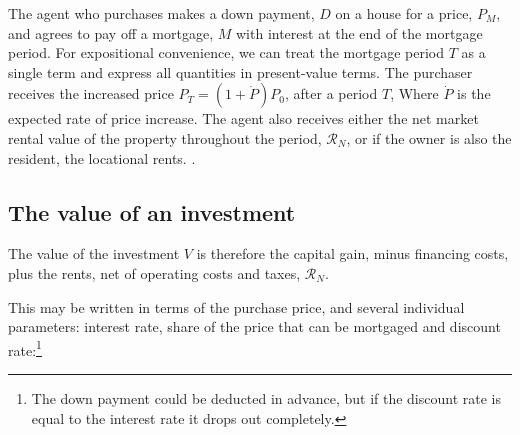 

    
 The agent who purchases makes a down payment, $D$ on a house for a price, $P_M$, and agrees to pay off a mortgage, $M$ with interest at the end of the mortgage period. For expositional convenience, we can treat the mortgage period $T$ as a single term and express all quantities  in present-value terms. The purchaser  receives the increased price $P_T = (1 + \dot P)P_0$,  after a period $T$, Where $\dot P$ is the expected rate of price increase. The agent also receives either the net market rental value of the property throughout the period, $\mathcal{R}_N$, or if the owner is also the resident, the locational rents.
\cite{anselinModernSpatialEconometrics2014, gelmanDataAnalysisUsing2006}.





 \subsection{The value of an investment}
The value of the investment $V$ is therefore the capital gain, minus financing costs, plus the rents, net of operating costs and taxes, $\mathcal{R}_N$.
 
 This may be written in terms of the purchase price, and several individual parameters: interest  rate, share of the price that can be mortgaged and  discount rate:\footnote{The down payment could be deducted in advance, but if the discount rate is equal to the interest rate it drops out completely.}
 
